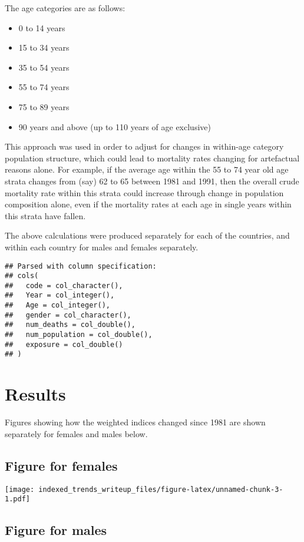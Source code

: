 \documentclass[]{article}
\providecommand{\tightlist}{%
  \setlength{\itemsep}{0pt}\setlength{\parskip}{0pt}}
\begin{document}
The age categories are as follows:

\begin{itemize}
\tightlist
\item
  0 to 14 years
\item
  15 to 34 years
\item
  35 to 54 years
\item
  55 to 74 years
\item
  75 to 89 years
\item
  90 years and above (up to 110 years of age exclusive)
\end{itemize}

This approach was used in order to adjust for changes in within-age
category population structure, which could lead to mortality rates
changing for artefactual reasons alone. For example, if the average age
within the 55 to 74 year old age strata changes from (say) 62 to 65
between 1981 and 1991, then the overall crude mortality rate within this
strata could increase through change in population composition alone,
even if the mortality rates at each age in single years within this
strata have fallen.

The above calculations were produced separately for each of the
countries, and within each country for males and females separately.

\begin{verbatim}
## Parsed with column specification:
## cols(
##   code = col_character(),
##   Year = col_integer(),
##   Age = col_integer(),
##   gender = col_character(),
##   num_deaths = col_double(),
##   num_population = col_double(),
##   exposure = col_double()
## )
\end{verbatim}

\section{Results}\label{results}

Figures showing how the weighted indices changed since 1981 are shown
separately for females and males below.

\subsection{Figure for females}\label{figure-for-females}

\texttt{[image: indexed\_trends\_writeup\_files/figure-latex/unnamed-chunk-3-1.pdf]}

\subsection{Figure for males}\label{figure-for-males}
\end{document}
